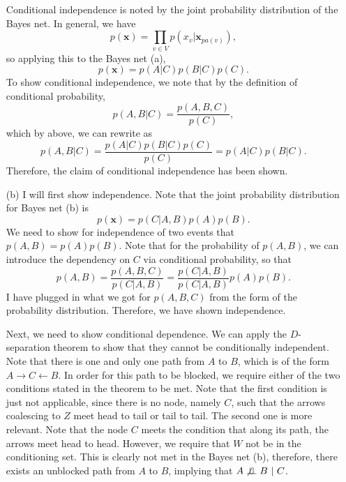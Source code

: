 \begin{solution}
\begin{itemize}
            \newpage
            Conditional independence is noted by the joint probability distribution of the Bayes net. In general, we have
            \[p(\textbf{x}) = \prod_{v \in V} p(x_v | \textbf{x}_{pa(v)}),\]
            so applying this to the Bayes net (a), 
            \[p(\textbf{x}) = p(A | C)p(B | C)p(C).\]
            To show conditional independence, we note that by the definition of conditional probability, 
            \[p(A, B | C) = \frac{p(A, B, C)}{p(C)},\]
            which by above, we can rewrite as
            \[p(A, B | C) = \frac{p(A | C)p(B | C)p(C)}{p(C)} = p(A | C)p(B | C).\]
            Therefore, the claim of conditional independence has been shown.
            
            \item[(b)] I will first show independence. Note that the joint probability distribution for Bayes net (b) is
            \[p(\textbf{x}) = p(C | A, B) p(A)p(B).\]
            We need to show for independence of two events that $p(A, B) = p(A)p(B)$. Note that for the probability of $p(A, B)$, we can introduce the dependency on $C$ via conditional probability, so that
            \[p(A, B) = \frac{p(A, B, C)}{p(C | A, B)} = \frac{p(C | A, B)}{p(C | A, B)}p(A)p(B).\]
            I have plugged in what we got for $p(A, B, C)$ from the form of the probability distribution. Therefore, we have shown independence. 

            \jump
            Next, we need to show conditional dependence. We can apply the $D$-separation theorem to show that they cannot be conditionally independent. Note that there is one and only one path from $A$ to $B$, which is of the form $A\to C \leftarrow B$. In order for this path to be blocked, we require either of the two conditions stated in the theorem to be met. Note that the first condition is just not applicable, since there is no node, namely $C$, such that the arrows coalescing to $Z$ meet head to tail or tail to tail. The second one is more relevant. Note that the node $C$ meets the condition that along its path, the arrows meet head to head. However, we require that $W$ not be in the conditioning set. This is clearly not met in the Bayes net (b), therefore, there exists an unblocked path from $A$ to $B$, implying that $A \not \independent B \ | \ C$. 
        \end{itemize}
\end{solution}

\newpage
